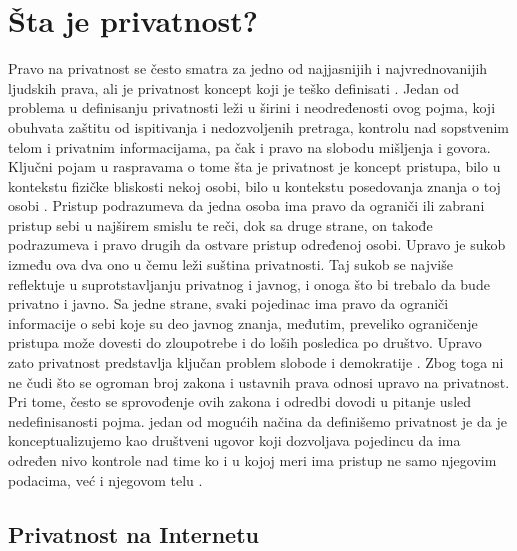 \documentclass[a4paper]{article}
\begin{document}
\section{Šta je privatnost?}
\label{sec:prvoPoglavlje}
Pravo na privatnost se često smatra za jedno od najjasnijih i najvrednovanijih ljudskih prava, ali je privatnost koncept koji je teško definisati \cite{solove}. Jedan od problema u definisanju privatnosti leži u širini i neodređenosti ovog pojma, koji obuhvata zaštitu od ispitivanja i nedozvoljenih pretraga, kontrolu nad sopstvenim telom i privatnim informacijama, pa čak i pravo na slobodu mišljenja i govora. Ključni pojam u raspravama o tome šta je privatnost je koncept pristupa, bilo u kontekstu fizičke bliskosti nekoj osobi, bilo u kontekstu posedovanja znanja o toj osobi \cite{ethics}. Pristup podrazumeva da jedna osoba ima pravo da ograniči ili zabrani pristup sebi u najširem smislu te reči, dok sa druge strane, on takođe podrazumeva i pravo drugih da ostvare pristup određenoj osobi. Upravo je sukob između ova dva ono u čemu leži suština privatnosti. Taj sukob se najviše reflektuje u suprotstavljanju  privatnog i javnog, i onoga što bi trebalo da bude privatno i javno. Sa jedne strane, svaki pojedinac ima pravo da ograniči informacije o sebi koje su deo javnog znanja, međutim, preveliko ograničenje pristupa može dovesti do zloupotrebe i do loših posledica po društvo. Upravo zato privatnost predstavlja ključan problem slobode i demokratije \cite{solove}. Zbog toga ni ne čudi što se ogroman broj zakona i ustavnih prava odnosi upravo na privatnost. Pri tome, često se sprovođenje ovih zakona i odredbi dovodi u pitanje usled nedefinisanosti pojma. jedan od mogućih načina da definišemo privatnost je da je konceptualizujemo kao društveni ugovor koji dozvoljava pojedincu da ima određen nivo kontrole nad time ko i u kojoj meri ima pristup ne samo njegovim podacima, već i njegovom telu \cite{ethics}.

\subsection{Privatnost na Internetu}
\label{subsec:privatnostNaInternetu}
\end{document}

